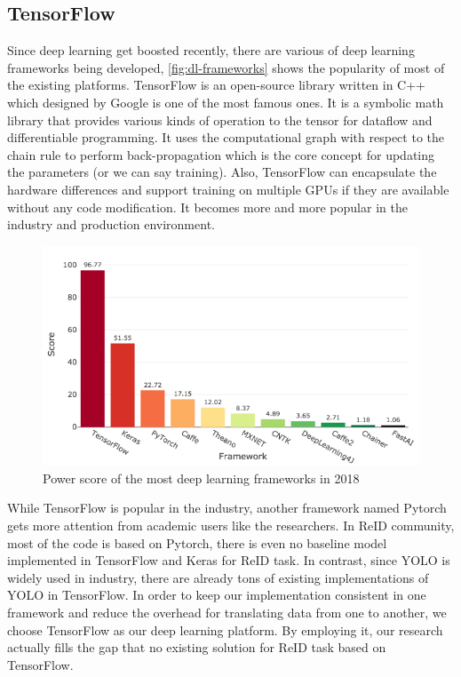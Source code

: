 \subsection{TensorFlow}
\label{sec:related_work_openiss_tf}

Since deep learning get boosted recently, there are various of deep learning
frameworks being developed, \autoref{fig:dl-frameworks} shows the popularity of
most of the existing platforms. TensorFlow \cite{tensorflow2015-whitepaper} is
an open-source library written in C++ which designed by Google is one of the
most famous ones. It is a symbolic math library that provides various kinds of
operation to the tensor for dataflow and differentiable programming. It uses
the computational graph with respect to the chain rule to perform
back-propagation which is the core concept for updating the parameters (or we
can say training). Also, TensorFlow can encapsulate the hardware differences and
support training on multiple GPUs if they are available without any code
modification. It becomes more and more popular in the industry and production
environment.

\begin{figure}
    \includegraphics[width=\linewidth]{figures/dl_framework.png}
    \caption{Power score of the most deep learning frameworks in 2018}
    \label{fig:dl-frameworks}
\end{figure}

While TensorFlow is popular in the industry, another framework named Pytorch
gets more attention from academic users like the researchers. In ReID
community, most of the code is based on Pytorch, there is even no baseline
model implemented in TensorFlow and Keras for ReID task.
In contrast, since YOLO is widely used in industry, there are already tons
of existing implementations of YOLO in TensorFlow. In order to keep our
implementation consistent in one framework and reduce the overhead for
translating data from one to another, we choose TensorFlow as our deep
learning platform. By employing it, our research actually fills the gap that no
existing solution for ReID task based on TensorFlow.


